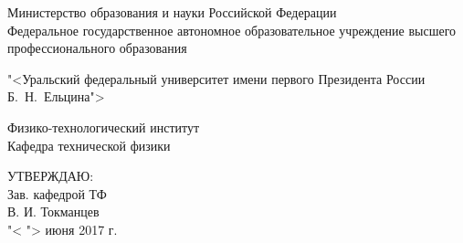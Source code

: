 \begin{titlepage}
\begin{center}

	\begin{normalsize}
		{
			\noindent Министерство образования и науки Российской Федерации\\
			\noindent Федеральное государственное автономное образовательное учреждение высшего профессионального образования\\
		}
	\end{normalsize}

	\par \vspace{0.2cm}
	
	{

		\noindent "<Уральский федеральный университет имени первого Президента России Б.~Н.~Ельцина">\\
	}
	\noindent Физико-технологический институт \\
	\noindent Кафедра технической физики \\

	\par \vspace{1cm}

	\hfill\begin{minipage}{.45\textwidth}
		\begin{large}
			\begin{raggedleft}
				УТВЕРЖДАЮ: \\
				Зав. кафедрой ТФ \\
				\underline{\hspace{2cm}} В. И. Токманцев \\
				"< \underline{\hspace{1cm}} "> июня 2017 г. \\
			\end{raggedleft}
		\end{large}
	\end{minipage}


\end{center}
\end{titlepage}
